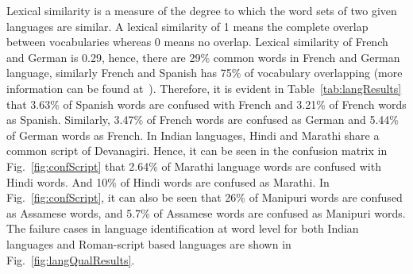 Lexical similarity is a measure of the degree to which the word sets of two given languages are similar. A lexical similarity of 1 means the complete overlap between vocabularies whereas 0 means no overlap. Lexical similarity of French and German is 0.29, hence, there are 29\% common words in French and German language, similarly French and Spanish has 75\% of vocabulary overlapping (more information can be found at~\cite{ethnologue}). Therefore, it is evident in Table~\ref{tab:langResults} that 3.63\% of Spanish words are confused with French and 3.21\% of French words as Spanish. Similarly, 3.47\% of French words are confused as German and 5.44\% of German words as French. In Indian languages, Hindi and Marathi share a common script of Devanagiri. Hence, it can be seen in the confusion matrix in Fig.~\ref{fig:confScript} that 2.64\% of Marathi language words are confused with Hindi words. And 10\% of Hindi words are confused as Marathi. In Fig.~\ref{fig:confScript}, it can also be seen that 26\% of Manipuri words are confused as Assamese words, and 5.7\% of Assamese words are confused as Manipuri words. The failure cases in language identification at word level for both Indian languages and Roman-script based languages are shown in Fig.~\ref{fig:langQualResults}.

